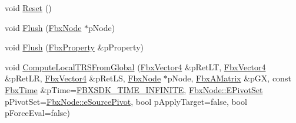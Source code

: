 \begin{DoxyCompactItemize}
\item 
void \hyperlink{class_fbx_anim_evaluator_a95c636f04474f350c3a1eda55ded8b29}{Reset} ()
\item 
void \hyperlink{class_fbx_anim_evaluator_a17b08c51a766be597aac881807913ea8}{Flush} (\hyperlink{class_fbx_node}{Fbx\+Node} $\ast$p\+Node)
\item 
void \hyperlink{class_fbx_anim_evaluator_a2f738a737153248cc988aca609c4bf84}{Flush} (\hyperlink{class_fbx_property}{Fbx\+Property} \&p\+Property)
\item 
void \hyperlink{class_fbx_anim_evaluator_a7ffe74bd370dfef23e5c1dd88b334e3d}{Compute\+Local\+T\+R\+S\+From\+Global} (\hyperlink{class_fbx_vector4}{Fbx\+Vector4} \&p\+Ret\+LT, \hyperlink{class_fbx_vector4}{Fbx\+Vector4} \&p\+Ret\+LR, \hyperlink{class_fbx_vector4}{Fbx\+Vector4} \&p\+Ret\+LS, \hyperlink{class_fbx_node}{Fbx\+Node} $\ast$p\+Node, \hyperlink{class_fbx_a_matrix}{Fbx\+A\+Matrix} \&p\+GX, const \hyperlink{class_fbx_time}{Fbx\+Time} \&p\+Time=\hyperlink{fbxtime_8h_a1e6db3fe0f84f0b7daa775739f93526f}{F\+B\+X\+S\+D\+K\+\_\+\+T\+I\+M\+E\+\_\+\+I\+N\+F\+I\+N\+I\+TE}, \hyperlink{class_fbx_node_ae62b7311ac4727654cdf1ebd5cbf7343}{Fbx\+Node\+::\+E\+Pivot\+Set} p\+Pivot\+Set=\hyperlink{class_fbx_node_ae62b7311ac4727654cdf1ebd5cbf7343ae8ed37a5c7e41f8d1cec9d3fa8424b69}{Fbx\+Node\+::e\+Source\+Pivot}, bool p\+Apply\+Target=false, bool p\+Force\+Eval=false)
\end{DoxyCompactItemize}
